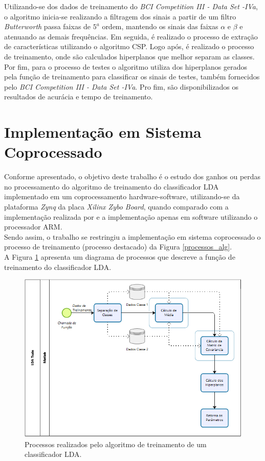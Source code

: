 Utilizando-se dos dados de treinamento do \textit{BCI Competition III - Data Set -IVa}, o algoritmo inicia-se realizando a filtragem dos sinais a partir de um filtro \textit{Butterworth} passa faixas de {$5^a$} ordem, mantendo os sinais das faixas {$\alpha$} e {$\beta$} e atenuando as demais frequências. Em seguida, é realizado o processo de extração de características utilizando o algoritmo CSP. Logo após, é realizado o processo de treinamento, onde são calculados hiperplanos que melhor separam as classes. Por fim, para o processo de testes o algoritmo utiliza dos hiperplanos gerados pela função de treinamento para classificar os sinais de testes, também fornecidos pelo \textit{BCI Competition III - Data Set -IVa}. Pro fim, são disponibilizados os resultados de acurácia e tempo de treinamento.

\section{Implementação em Sistema Coprocessado}

Conforme apresentado, o objetivo deste trabalho é o estudo dos ganhos ou perdas no processamento do algoritmo de treinamento do classificador LDA implementado em um coprocessamento hardware-software, utilizando-se da plataforma \textit{Zynq} da placa \textit{Xilinx Zybo Board}, quando comparado com a implementação realizada por \cite{F.Lotte} e a implementação apenas em software utilizando o processador ARM.\\
Sendo assim, o trabalho se restringiu a implementação em sistema coprocessado o processo de treinamento (processo destacado) da Figura \ref{processos_alg}.\\
A Figura \ref{processos_train} apresenta um diagrama de processos que descreve a função de treinamento do classificador LDA.

\begin{figure}[h]
	\centering
	\includegraphics[keepaspectratio=true,scale=0.6]{figuras/Processos_LDA_Train.PNG}
	\caption{Processos realizados pelo algoritmo de treinamento de um classificador LDA.}
	\label{processos_train}
\end{figure}

